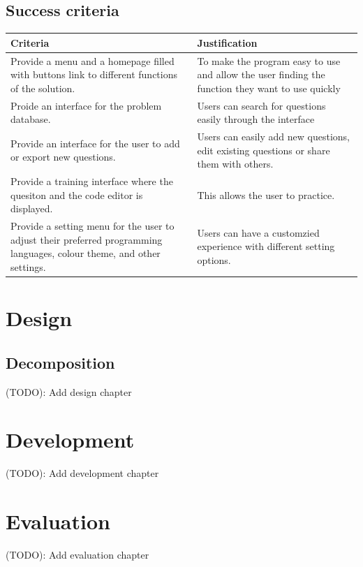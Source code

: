 \documentclass[a4paper]{report}
\begin{document}
\section{Success criteria}

\begin{tabulary}{\linewidth}{|L|L|}
      \hline
      Criteria & Justification \\
      \hline
      Provide a menu and a homepage filled with buttons link to different functions of the solution. & To make the program easy to use and allow the user finding the function they want to use quickly \\
      \hline 
      Proide an interface for the problem database. & Users can search for questions easily through the interface \\
      \hline
      Provide an interface for the user to add or export new questions. & Users can easily add new questions, edit existing questions or share them with others. \\
      \hline
      Provide a training interface where the quesiton and the code editor is displayed. & This allows the user to practice. \\
      \hline
      Provide a setting menu for the user to adjust their preferred programming languages, colour theme, and other settings. & Users can have a customzied experience with different setting options. \\
      \hline
\end{tabulary}

\chapter{Design}

\section{Decomposition}

(TODO): Add design chapter

\chapter{Development}

(TODO): Add development chapter

\chapter{Evaluation}

(TODO): Add evaluation chapter
\end{document}
